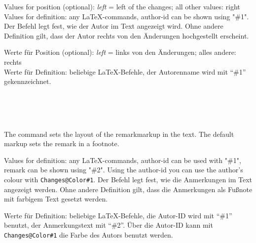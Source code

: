 	Values for position (optional): \emph{left} = left of the changes; all other values: right\\
	Values for definition: any \LaTeX-commands, author-id can be shown using "\#1".
\fi
	\ifGERMAN
		Der Befehl  legt fest, wie der Autor im Text angezeigt wird.
		Ohne andere Definition gilt, dass der Autor rechts von den Änderungen hochgestellt erscheint.

		Werte für Position (optional): \emph{left} = links von den Änderungen; alles andere: rechts\\
		Werte für Definition: beliebige \LaTeX-Befehle, der Autorenname wird mit "`\#1"' gekennzeichnet.
	\fi
\begin{einspiel}
	\>
\end{einspiel}
\begin{einspiel}[true]
	\>\\
	\>\\
	\>\\
	\>
\end{einspiel}

\DescribeMacro{\setremarkmarkup}
\ifENGLISH
	The command  sets the layout of the remarkmarkup in the text.
	The default markup sets the remark in a footnote.

	Values for definition: any \LaTeX-commands, author-id can be used with "\#1", remark can be shown using "\#2".
	Using the author-id you can use the author's colour with \texttt{Changes@Color\#1}.
\fi
	\ifGERMAN
		Der Befehl  legt fest, wie die Anmerkungen im Text angezeigt werden.
		Ohne andere Definition gilt, dass die Anmerkungen als Fußnote mit farbigem Text gesetzt werden.

		Werte für Definition: beliebige \LaTeX-Befehle, die Autor-ID wird mit "`\#1"' benutzt, der Anmerkungstext mit "`\#2"'.
		Über die Autor-ID kann mit \texttt{Changes@Color\#1} die Farbe des Autors benutzt werden.
	\fi
\begin{einspiel}
	\>
\end{einspiel}
\begin{einspiel}[true]
	\>\\
	\>
\end{einspiel}

